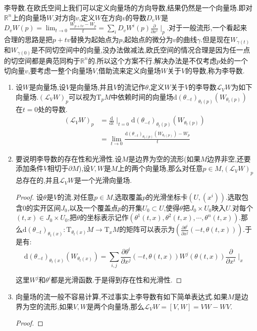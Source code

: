 李导数.在欧氏空间上我们可以定义向量场的方向导数,结果仍然是一个向量场.即对$\mathbb{R}^n$上的向量场$W$,对方向$v$,定义$W$在方向$v$的导数$D_vW$是$D_vW(p)=\lim_{t\to0}\frac{W_{p+tv}-W_p}{t}=\sum_iD_vW^i(p)\frac{\partial}{\partial x^i}\mid_p$.对于一般流形,一个看起来合理的思路是把$p+tv$替换为起始点为$p$,起始点的微分为$v$的曲线$\gamma$.但是现在$W_{\gamma(t)}$和$W_{\gamma(0)}$是不同切空间中的向量,没办法做减法,欧氏空间的情况合理是因为任一点的切空间都是典范同构于$\mathbb{R}^n$的.所以这个方案不行.解决办法是不仅考虑$p$处的一个切向量$v$,要考虑一整个向量场$V$,借助流来定义向量场$W$关于$V$的导数,称为李导数.
\begin{enumerate}
	\item 设$W$是向量场,设$V$是向量场,并且$V$的流记作$\theta$,定义$W$关于$V$的李导数$\mathscr{L}_VW$为如下向量场.$(\mathscr{L}_VW)_p$可以视为$\mathrm{T}_pM$中依赖时间的向量场$\mathrm{d}(\theta_{-t})_{\theta_{t}(p)}(W_{\theta_t(p)})$在$t=0$处的导数.
	\begin{align*}
	(\mathscr{L}_VW)_p&=\frac{\mathrm{d}}{\mathrm{d}t}\mid_{t=0}\mathrm{d}(\theta_{-t})_{\theta_{t}(p)}(W_{\theta_t(p)})\\&=\lim_{t\to0}\frac{\mathrm{d}(\theta_{-t})_{\theta_t(p)}(W_{\theta_t(p)})-W_p}{t}
	\end{align*}
	\item 要说明李导数的存在性和光滑性.设$M$是边界为空的流形(如果$M$边界非空,还要添加条件$V$相切于$\partial M$),设$V,W$是$M$上的两个向量场,那么对任意$p\in M$,$(\mathscr{L}_VW)_p$总存在的,并且$\mathscr{L}_VW$是一个光滑向量场.
	\begin{proof}
		
		设$\theta$是$V$的流.对任意$p\in M$,选取覆盖$p$的光滑坐标卡$(U,(x^i))$.选取包含0的实开区间$J_0$,以及一个覆盖点$p$的开集$U_0\subset U$,使得$\theta$把$J_0\times U_0$映入$U$.对每个$(t,x)\in J_0\times U_0$,把$\theta$的坐标表示记作$(\theta^1(t,x),\theta^2(t,x),\cdots,\theta^n(t,x))$.那么$\mathrm{d}(\theta_{-t})_{\theta_t(x)}:\mathrm{T}_{\theta_t(x)}M\to\mathrm{T}_xM$的矩阵可以表示为$\left(\frac{\partial\theta^i}{\partial x^j}(-t,\theta(t,x))\right)$.于是有:
		$$\mathrm{d}(\theta_{-t})_{\theta_t(x)}(W_{\theta_t(x)})=\sum_{i,j}\frac{\partial\theta^i}{\partial x^j}(-t,\theta(t,x))W^j(\theta(t,x))\frac{\partial}{\partial x^i}\mid_x$$
		
		这里$W^j$和$\theta^i$都是光滑函数.于是得到存在性和光滑性.
	\end{proof}
	\item 向量场的流一般不容易计算,不过事实上李导数有如下简单表达式.如果$M$是边界为空的流形,如果$V,W$是两个向量场,那么$\mathscr{L}_VW=[V,W]=VW-WV$.
	\begin{proof}
		

\end{proof}
\end{enumerate}
